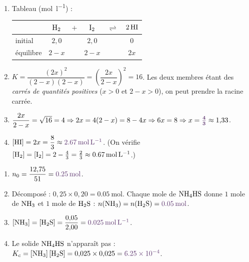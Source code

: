 \documentclass[11pt,a4paper]{article}
\newcommand{\rep}[1]{\textcolor{primarydark}{\textbf{#1}}}
\begin{document}
\begin{correction}
\begin{enumerate}[label=\alph*),leftmargin=2em,topsep=2pt,itemsep=2pt]
  \item Tableau (\si{\mol\per\litre}) :
  \begin{center}\small
  \begin{tabular}{@{}lccccc@{}}
  \toprule
   & $\ce{H2}$ & $+$ & $\ce{I2}$ & $\rightleftharpoons$ & $2\,\ce{HI}$ \\
  \midrule
  initial   & $2{,}0$ & & $2{,}0$ & & $0$ \\
  équilibre & $2-x$   & & $2-x$   & & $2x$ \\
  \bottomrule
  \end{tabular}
  \end{center}
  \item $K = \dfrac{(2x)^2}{(2-x)(2-x)} = \left(\dfrac{2x}{2-x}\right)^2 = 16$. Les deux membres étant des
        \emph{carrés de quantités positives} ($x>0$ et $2-x>0$), on peut prendre la racine carrée.
  \item $\dfrac{2x}{2-x} = \sqrt{16} = 4 \Rightarrow 2x = 4(2-x) = 8 - 4x \Rightarrow 6x = 8 \Rightarrow
        x = \textcolor{primarydark}{\boldsymbol{\tfrac{4}{3}}} \approx 1{,}33$.
  \item $[\ce{HI}] = 2x = \dfrac{8}{3} \approx \rep{\SI{2.67}{\mol\per\litre}}$.
        (On vérifie $[\ce{H2}]=[\ce{I2}]=2-\tfrac43=\tfrac23\approx\SI{0.67}{\mol\per\litre}$.)
\end{enumerate}
\end{correction}

\begin{correction}
\begin{enumerate}[label=\alph*),leftmargin=2em,topsep=2pt,itemsep=2pt]
  \item $n_0 = \dfrac{12{,}75}{51} = \rep{\SI{0.25}{\mol}}$.
  \item Décomposé : $0{,}25 \times 0{,}20 = \SI{0.05}{\mol}$. Chaque mole de $\ce{NH4HS}$ donne $1$ mole de
        $\ce{NH3}$ et $1$ mole de $\ce{H2S}$ : $n(\ce{NH3}) = n(\ce{H2S}) = \rep{\SI{0.05}{\mol}}$.
  \item $[\ce{NH3}] = [\ce{H2S}] = \dfrac{0{,}05}{2{,}00} = \rep{\SI{0.025}{\mol\per\litre}}$.
  \item Le solide $\ce{NH4HS}$ n'apparaît pas : $K_c = [\ce{NH3}]\,[\ce{H2S}] = 0{,}025 \times 0{,}025 =
        \rep{\num{6.25e-4}}$.
\end{enumerate}
\end{correction}
\end{document}
